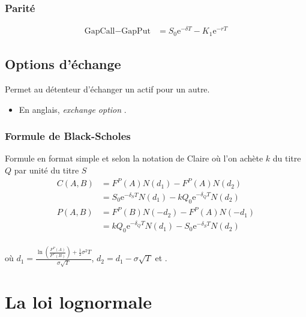 \documentclass[10pt, french]{article}
\begin{document}
\begin{multicols*}{2}
\subsubsection*{Parité}
\begin{align*}
	\text{GapCall}	-	\text{GapPut}
	&=	S_{0}\textrm{e}^{-\delta T}	-	K_{1}\textrm{e}^{-rT}
\end{align*}

\columnbreak
\subsection*{Options d'échange}
\begin{definitionNOHFILL}
Permet au détenteur d'échanger un actif pour un autre.

\tcbline

\begin{itemize}[leftmargin = *]
	\item	En anglais, \og \textit{exchange option} \fg{}.
\end{itemize}
\end{definitionNOHFILL}

\subsubsection*{Formule de Black-Scholes}
Formule en format simple et selon la notation de Claire où l'on achète $k$ du titre $Q$ par unité du titre $S$
\begin{align*}
	C(A, B)
	&=	F^{P}(A)N(d_{1})	-	F^{P}(A)N(d_{2})	\\
	&=	S_{0} \textrm{e}^{-\delta_{S}T}N(d_{1})	-	kQ_{0} \textrm{e}^{-\delta_{Q}T}N(d_{2})	\\
	P(A, B)
	&=	F^{P}(B)N(-d_{2})	-	F^{P}(A)N(-d_{1})	\\
	&=	kQ_{0} \textrm{e}^{-\delta_{Q}T}N(d_{1})	-	S_{0} \textrm{e}^{-\delta_{S}T}N(d_{2})	\\	
\end{align*}

où $d_{1}	=	\frac{\ln\left(\frac{F^{P}(A)}{F^{P}(B)}\right) + \frac{1}{2} \sigma^{2} T}{\sigma \sqrt{T}}$, $d_{2}	=	d_{1} - \sigma \sqrt{T}$ et .


\pagebreak
\setcounter{section}{17}
\section{La loi lognormale}



\end{multicols*}
\end{document}
